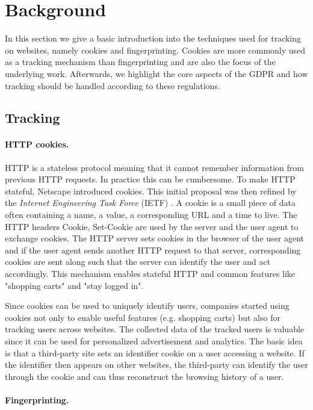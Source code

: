\section{Background}
\label{sec:background}

In this section we give a basic introduction into the techniques used for tracking on websites, namely cookies and
fingerprinting. Cookies are more commonly used as a tracking mechanism than fingerprinting and are also the focus of
the underlying work. Afterwards, we highlight
the core aspects of the GDPR and how tracking should be handled according to these regulations.

\subsection{Tracking}

\paragraph{HTTP cookies.}

HTTP is a stateless protocol meaning that it cannot remember information from previous HTTP requests. In practice this
can be cumbersome. To make HTTP stateful, Netscape introduced cookies. This initial proposal was then refined by the
\emph{Internet Engineering Task Force} (IETF) \cite{rfc6265}. A cookie is a small piece of data often containing a name,
a value, a corresponding URL and a time to live. The HTTP headers Cookie, Set-Cookie are used by the server and the user agent to
exchange cookies. The HTTP server sets cookies in the browser of the user agent and if the user agent sends another HTTP
request to that server, corresponding cookies are sent along such that the server can identify the user and act accordingly. This
mechanism enables stateful HTTP and common features like "shopping carts" and "stay logged in".

Since cookies can be used to uniquely identify users, companies started using cookies not only to enable useful features
(e.g. shopping carts) but also for tracking users across websites. The collected data of the tracked
users is valuable since it can be used for
personalized advertisement and analytics. The basic idea is that a third-party site sets an identifier cookie on a
user accessing a website. If the identifier then appears on other websites, the third-party can identify the user
through the cookie and can thus reconstruct the browsing history of a user.

\paragraph{Fingerprinting.}

